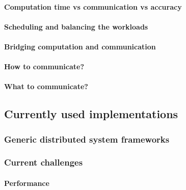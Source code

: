 \paragraph{Computation time vs communication vs accuracy}
\paragraph{Scheduling and balancing the workloads}
\paragraph{Bridging computation and communication}
\paragraph{How to communicate?}
\paragraph{What to communicate?}










\subsection{Currently used implementations}
\subsubsection{Generic distributed system frameworks}


\subsubsection{Current challenges}

\paragraph{Performance}

